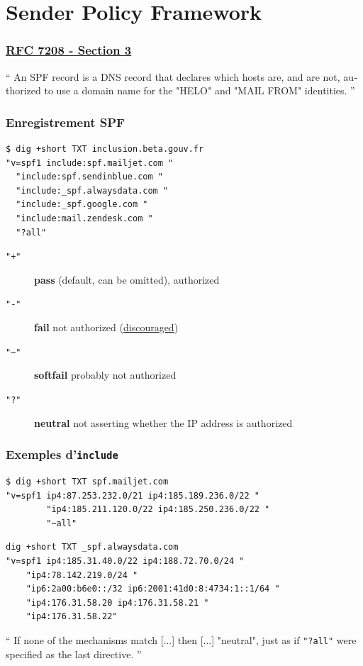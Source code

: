 \documentclass{beamer}
\begin{document}
\section{Sender Policy Framework}

\begin{frame}[fragile]
    \frametitle{\href{https://datatracker.ietf.org/doc/html/rfc7208\#section-3}{RFC 7208 - Section 3}}

    \foreignquote{english}{
        An SPF record is a DNS record that declares which hosts are, and are
        not, authorized to use a domain name for the "HELO" and "MAIL FROM"
        identities.
    }
\end{frame}

\begin{frame}[fragile]
    \frametitle{Enregistrement SPF}
    \begin{verbatim}
$ dig +short TXT inclusion.beta.gouv.fr
"v=spf1 include:spf.mailjet.com "
  "include:spf.sendinblue.com "
  "include:_spf.alwaysdata.com "
  "include:_spf.google.com "
  "include:mail.zendesk.com "
  "?all"
    \end{verbatim}

    \begin{description}
        \item[\texttt{"+"}] \textbf{pass} (default, can be omitted), authorized
        \item[\texttt{"-"}] \textbf{fail} not authorized (\href{https://www.mailhardener.com/blog/why-mailhardener-recommends-spf-softfail-over-fail}{discouraged})
        \item[\texttt{"\~{}"}] \textbf{softfail} probably not authorized
        \item[\texttt{"?"}] \textbf{neutral} not asserting whether the IP address is authorized
    \end{description}
\end{frame}

\begin{frame}[fragile]
    \frametitle{Exemples d'\texttt{include}}
    \begin{verbatim}
$ dig +short TXT spf.mailjet.com
"v=spf1 ip4:87.253.232.0/21 ip4:185.189.236.0/22 "
        "ip4:185.211.120.0/22 ip4:185.250.236.0/22 "
        "~all"
    \end{verbatim}

    \begin{verbatim}
dig +short TXT _spf.alwaysdata.com
"v=spf1 ip4:185.31.40.0/22 ip4:188.72.70.0/24 "
    "ip4:78.142.219.0/24 "
    "ip6:2a00:b6e0::/32 ip6:2001:41d0:8:4734:1::1/64 "
    "ip4:176.31.58.20 ip4:176.31.58.21 "
    "ip4:176.31.58.22"
    \end{verbatim}

    \foreignquote{english}{
        If none of the mechanisms match [...] then [...] "neutral", just as if
        \texttt{"?all"} were specified as the last directive.
    }
\end{frame}
\end{document}
